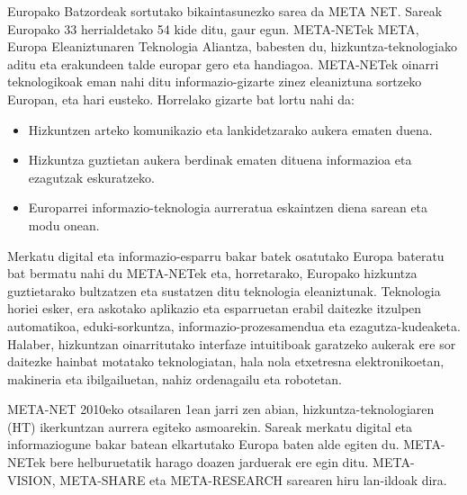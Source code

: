 \cleardoublepage



\begin{multicols}{2}

Europako Batzordeak sortutako bikaintasunezko sarea da META NET. Sareak Europako 33 herrialdetako 54 kide ditu, gaur egun. META-NETek META, Europa Eleaniztunaren Teknologia Aliantza, babesten du, hizkuntza-teknologiako aditu eta erakundeen talde europar gero eta handiagoa. META-NETek oinarri teknologikoak eman nahi ditu informazio-gizarte zinez eleaniztuna sortzeko Europan, eta hari eusteko. Horrelako gizarte bat lortu nahi da:

\begin{itemize}
	\item Hizkuntzen arteko komunikazio eta lankidetzarako aukera ematen duena.
	\item 	Hizkuntza guztietan aukera berdinak ematen dituena informazioa eta ezagutzak eskuratzeko.
	\item Europarrei informazio-teknologia aurreratua eskaintzen diena sarean eta modu onean.
\end{itemize}

Merkatu digital eta informazio-esparru bakar batek osatutako Europa bateratu bat bermatu nahi du META-NETek eta, horretarako, Europako hizkuntza guztietarako bultzatzen eta sustatzen ditu teknologia eleaniztunak. Teknologia horiei esker, era askotako aplikazio eta esparruetan erabil daitezke itzulpen automatikoa, eduki-sorkuntza, informazio-prozesamendua eta ezagutza-kudeaketa. Halaber, hizkuntzan oinarritutako interfaze intuitiboak garatzeko aukerak ere sor daitezke hainbat motatako teknologiatan, hala nola etxetresna elektronikoetan, makineria eta ibilgailuetan, nahiz ordenagailu eta robotetan.


   META-NET 2010eko otsailaren 1ean jarri zen abian, hizkuntza-teknologiaren (HT) ikerkuntzan aurrera egiteko asmoarekin. Sareak merkatu digital eta informaziogune bakar batean elkartutako Europa baten alde egiten du. META-NETek bere helburuetatik harago doazen jarduerak ere egin ditu. META-VISION, META-SHARE eta META-RESEARCH sarearen hiru lan-ildoak dira.


\end{multicols}

